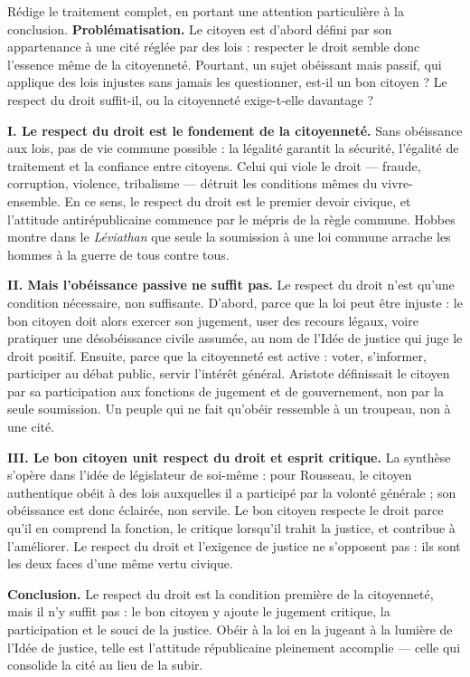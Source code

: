 \documentclass[11pt]{article}
\newcommand{\cle}[1]{{\popxbold\color{popdark}#1}}
\begin{document}
\begin{exoresolu}
Rédige le traitement complet, en portant une attention particulière à la conclusion.
\tcblower
\textbf{Problématisation.} Le citoyen est d'abord défini par son appartenance à une cité réglée par des lois : respecter le droit semble donc l'essence même de la citoyenneté. Pourtant, un sujet obéissant mais passif, qui applique des lois injustes sans jamais les questionner, est-il un bon citoyen ? Le respect du droit suffit-il, ou la citoyenneté exige-t-elle davantage ?

\textbf{I. Le respect du droit est le fondement de la citoyenneté.} Sans obéissance aux lois, pas de vie commune possible : la \cle{légalité} garantit la sécurité, l'égalité de traitement et la confiance entre citoyens. Celui qui viole le droit — fraude, corruption, violence, tribalisme — détruit les conditions mêmes du vivre-ensemble. En ce sens, le respect du droit est le premier devoir civique, et l'attitude antirépublicaine commence par le mépris de la règle commune. Hobbes montre dans le \emph{Léviathan} que seule la soumission à une loi commune arrache les hommes à la guerre de tous contre tous.

\textbf{II. Mais l'obéissance passive ne suffit pas.} Le respect du droit n'est qu'une condition nécessaire, non suffisante. D'abord, parce que la loi peut être injuste : le bon citoyen doit alors exercer son jugement, user des recours légaux, voire pratiquer une désobéissance civile assumée, au nom de l'Idée de justice qui juge le droit positif. Ensuite, parce que la citoyenneté est active : voter, s'informer, participer au débat public, servir l'intérêt général. Aristote définissait le citoyen par sa participation aux fonctions de jugement et de gouvernement, non par la seule soumission. Un peuple qui ne fait qu'obéir ressemble à un troupeau, non à une cité.

\textbf{III. Le bon citoyen unit respect du droit et esprit critique.} La synthèse s'opère dans l'idée de \cle{législateur de soi-même} : pour Rousseau, le citoyen authentique obéit à des lois auxquelles il a participé par la volonté générale ; son obéissance est donc éclairée, non servile. Le bon citoyen respecte le droit parce qu'il en comprend la fonction, le critique lorsqu'il trahit la justice, et contribue à l'améliorer. Le respect du droit et l'exigence de justice ne s'opposent pas : ils sont les deux faces d'une même vertu civique.

\textbf{Conclusion.} Le respect du droit est la condition première de la citoyenneté, mais il n'y suffit pas : le bon citoyen y ajoute le jugement critique, la participation et le souci de la justice. Obéir à la loi en la jugeant à la lumière de l'Idée de justice, telle est l'attitude républicaine pleinement accomplie — celle qui consolide la cité au lieu de la subir.
\end{exoresolu}
\end{document}
